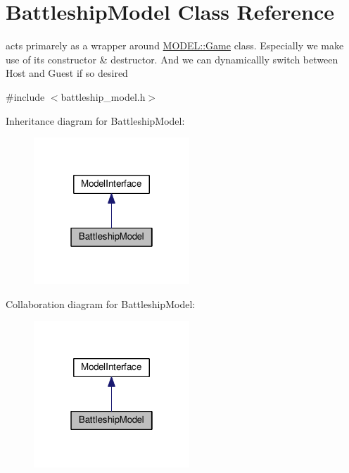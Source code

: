 \hypertarget{classMODEL_1_1BattleshipModel}{}\section{Battleship\+Model Class Reference}
\label{classMODEL_1_1BattleshipModel}


acts primarely as a wrapper around \hyperlink{classMODEL_1_1Game}{M\+O\+D\+E\+L\+::\+Game} class. Especially we make use of its constructor \& destructor. And we can dynamicallly switch between Host and Guest if so desired  




{\ttfamily \#include $<$battleship\+\_\+model.\+h$>$}



Inheritance diagram for Battleship\+Model\+:\nopagebreak
\begin{figure}[H]
\begin{center}
\leavevmode
\includegraphics[width=166pt]{classMODEL_1_1BattleshipModel__inherit__graph}
\end{center}
\end{figure}


Collaboration diagram for Battleship\+Model\+:\nopagebreak
\begin{figure}[H]
\begin{center}
\leavevmode
\includegraphics[width=166pt]{classMODEL_1_1BattleshipModel__coll__graph}
\end{center}
\end{figure}
